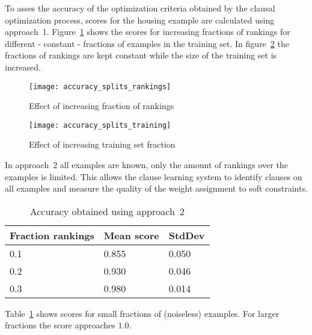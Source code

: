 \begin{experiment}

	To asses the accuracy of the optimization criteria obtained by the clausal optimization process, scores for the housing example are calculated using approach~1.
	Figure~\ref{fig:accuracy_splits_rankings} shows the scores for increasing fractions of rankings for different - constant - fractions of examples in the training set.
	In figure~\ref{fig:accuracy_splits_training} the fractions of rankings are kept constant while the size of the training set is increased.

	\begin{figure}

		\caption{Effect of increasing fraction of rankings}
		\centering
			\texttt{[image: accuracy\_splits\_rankings]}
		\label{fig:accuracy_splits_rankings}

	\end{figure}

	\begin{figure}

		\caption{Effect of increasing training set fraction}
		\centering
			\texttt{[image: accuracy\_splits\_training]}
		\label{fig:accuracy_splits_training}

	\end{figure}

\end{experiment}

\begin{experiment}
\label{exp:exp_acc_approach2}
		In approach~2 all examples are known, only the amount of rankings over the examples is limited.
		This allows the clause learning system to identify clauses on all examples and measure the quality of the weight assignment to soft constraints.

		\begin{table}[!htp]
		\begin{tabularx}{\textwidth}{XXX}
			\textbf{Fraction rankings}	& \textbf{Mean score}	& \textbf{StdDev} \\
			\toprule
			0.1 	& 0.855		& 0.050 \\
			0.2 	& 0.930		& 0.046 \\
			0.3 	& 0.980 	& 0.014 \\
		\end{tabularx}
		\caption{Accuracy obtained using approach~2}
		\label{tbl:exp_acc_approach2}

		Table~\ref{tbl:exp_acc_approach2} shows scores for small fractions of (noiseless) examples.
		For larger fractions the score approaches $1.0$.
	\end{table}

\end{experiment}

